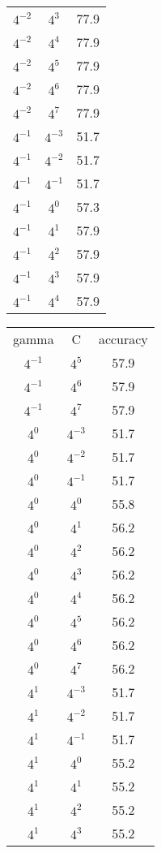 \documentclass[12pt]{article}
\newenvironment{problem}[2][Problem]{\begin{trivlist}
\item[\hskip \labelsep {\bfseries #1}\hskip \labelsep {\bfseries #2}]}{\end{trivlist}}
\begin{document}
\begin{problem}{5. Programming}
\begin{center}
\begin{tabular}{ c | c | c }
$4^{-2}$   & $4^{3}$  &  77.9\\
$4^{-2}$   & $4^{4}$  &  77.9\\
$4^{-2}$   & $4^{5}$  &  77.9\\
$4^{-2}$   & $4^{6}$  &  77.9\\
$4^{-2}$   & $4^{7}$  &  77.9\\
$4^{-1}$   & $4^{-3}$  &  51.7\\
$4^{-1}$   & $4^{-2}$  &  51.7\\
$4^{-1}$   & $4^{-1}$  &  51.7\\
$4^{-1}$   & $4^{0}$  &  57.3\\
$4^{-1}$   & $4^{1}$  &  57.9\\
$4^{-1}$   & $4^{2}$  &  57.9\\
$4^{-1}$   & $4^{3}$  &  57.9\\
$4^{-1}$   & $4^{4}$  &  57.9\\
\end{tabular}
\begin{tabular}{ c | c | c }
gamma & C & accuracy\\
$4^{-1}$   & $4^{5}$  &  57.9\\
$4^{-1}$   & $4^{6}$  &  57.9\\
$4^{-1}$   & $4^{7}$  &  57.9\\
$4^{0 }$  & $4^{-3}$  &  51.7\\
$4^{0 }$  & $4^{-2}$  &  51.7\\
$4^{0 }$  & $4^{-1}$  &  51.7\\
$4^{0 }$  & $4^{0}$  &  55.8\\
$4^{0 }$  & $4^{1}$  &  56.2\\
$4^{0 }$  & $4^{2}$  &  56.2\\
$4^{0 }$  & $4^{3}$  &  56.2\\
$4^{0 }$  & $4^{4}$  &  56.2\\
$4^{0 }$  & $4^{5}$  &  56.2\\
$4^{0 }$  & $4^{6}$  &  56.2\\
$4^{0 }$  & $4^{7}$  &  56.2\\
$4^{1 }$  & $4^{-3}$  &  51.7\\
$4^{1 }$  & $4^{-2}$  &  51.7\\
$4^{1 }$  & $4^{-1}$  &  51.7\\
$4^{1 }$  & $4^{0}$  &  55.2\\
$4^{1 }$  & $4^{1}$  &  55.2\\
$4^{1 }$  & $4^{2}$  &  55.2\\
$4^{1 }$  & $4^{3}$  &  55.2\\

\end{tabular}
\end{center}
\end{problem}
\end{document}
